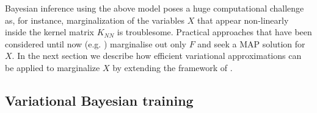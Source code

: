 \documentclass{article} %
\begin{document}
Bayesian inference using the above model poses a huge computational
challenge as, for instance, marginalization of the variables $X$ that
appear non-linearly inside the kernel matrix $K_{NN}$ is
troublesome. Practical approaches that have been considered until now
(e.g. \cite{hgplvm, GPDM}) marginalise out only $F$ and seek a MAP
solution for $X$.
%
 In the next section we describe how efficient variational 
approximations can be applied to marginalize $X$ by extending the 
framework of \cite{BayesianGPLVM}.

\subsection{Variational Bayesian training} 
\end{document}
